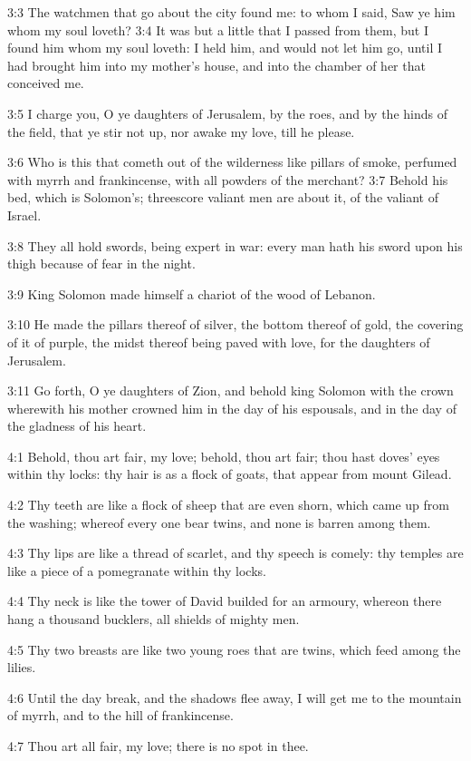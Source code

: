 3:3 The watchmen that go about the city found me: to whom I said, Saw
ye him whom my soul loveth?  3:4 It was but a little that I passed
from them, but I found him whom my soul loveth: I held him, and would
not let him go, until I had brought him into my mother's house, and
into the chamber of her that conceived me.

3:5 I charge you, O ye daughters of Jerusalem, by the roes, and by the
hinds of the field, that ye stir not up, nor awake my love, till he
please.

3:6 Who is this that cometh out of the wilderness like pillars of
smoke, perfumed with myrrh and frankincense, with all powders of the
merchant?  3:7 Behold his bed, which is Solomon's; threescore valiant
men are about it, of the valiant of Israel.

3:8 They all hold swords, being expert in war: every man hath his
sword upon his thigh because of fear in the night.

3:9 King Solomon made himself a chariot of the wood of Lebanon.

3:10 He made the pillars thereof of silver, the bottom thereof of
gold, the covering of it of purple, the midst thereof being paved with
love, for the daughters of Jerusalem.

3:11 Go forth, O ye daughters of Zion, and behold king Solomon with
the crown wherewith his mother crowned him in the day of his
espousals, and in the day of the gladness of his heart.

4:1 Behold, thou art fair, my love; behold, thou art fair; thou hast
doves' eyes within thy locks: thy hair is as a flock of goats, that
appear from mount Gilead.

4:2 Thy teeth are like a flock of sheep that are even shorn, which
came up from the washing; whereof every one bear twins, and none is
barren among them.

4:3 Thy lips are like a thread of scarlet, and thy speech is comely:
thy temples are like a piece of a pomegranate within thy locks.

4:4 Thy neck is like the tower of David builded for an armoury,
whereon there hang a thousand bucklers, all shields of mighty men.

4:5 Thy two breasts are like two young roes that are twins, which feed
among the lilies.

4:6 Until the day break, and the shadows flee away, I will get me to
the mountain of myrrh, and to the hill of frankincense.

4:7 Thou art all fair, my love; there is no spot in thee.

